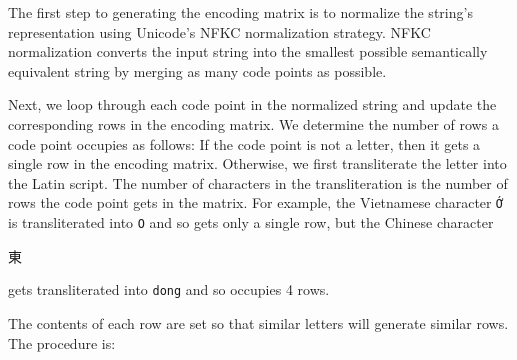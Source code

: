 \documentclass[sigconf,10pt]{acmart}
\newcommand{\str}[1]{\texttt{#1}}
\begin{document}
\begin{description}
The first step to generating the encoding matrix is to normalize the string's representation using Unicode's NFKC normalization strategy.
NFKC normalization converts the input string into the smallest possible semantically equivalent string by merging as many code points as possible.

Next, we loop through each code point in the normalized string and update the corresponding rows in the encoding matrix.
We determine the number of rows a code point occupies as follows:
If the code point is not a letter, then it gets a single row in the encoding matrix.
Otherwise, we first transliterate the letter into the Latin script.
The number of characters in the transliteration is the number of rows the code point gets in the matrix.
For example, the Vietnamese character \str{\foreignlanguage{vietnamese}{Ớ}} is transliterated into \str{O} and so gets only a single row,
but the Chinese character \begin{CJK}{UTF8}{min}東\end{CJK} gets transliterated into \str{dong} and so occupies 4 rows.

The contents of each row are set so that similar letters will generate similar rows.
The procedure is:


\end{description}
\end{document}
